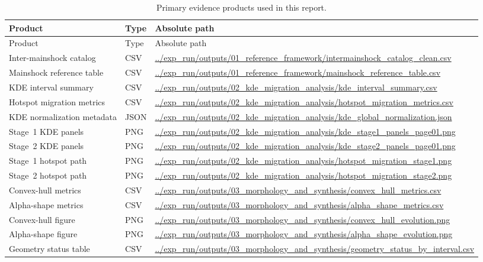 \documentclass[11pt]{article}
\begin{document}
\begin{longtable}{>{\raggedright\arraybackslash}p{3.3cm} >{\raggedright\arraybackslash}p{2.5cm} >{\raggedright\arraybackslash}p{8.2cm}}
\caption{Primary evidence products used in this report.}\label{tab:evidence}\\
\toprule
Product & Type & Absolute path \\
\midrule
\endfirsthead
\toprule
Product & Type & Absolute path \\
\midrule
\endhead
Inter-mainshock catalog & CSV & \url{../exp_run/outputs/01_reference_framework/intermainshock_catalog_clean.csv} \\
Mainshock reference table & CSV & \url{../exp_run/outputs/01_reference_framework/mainshock_reference_table.csv} \\
KDE interval summary & CSV & \url{../exp_run/outputs/02_kde_migration_analysis/kde_interval_summary.csv} \\
Hotspot migration metrics & CSV & \url{../exp_run/outputs/02_kde_migration_analysis/hotspot_migration_metrics.csv} \\
KDE normalization metadata & JSON & \url{../exp_run/outputs/02_kde_migration_analysis/kde_global_normalization.json} \\
Stage~1 KDE panels & PNG & \url{../exp_run/outputs/02_kde_migration_analysis/kde_stage1_panels_page01.png} \\
Stage~2 KDE panels & PNG & \url{../exp_run/outputs/02_kde_migration_analysis/kde_stage2_panels_page01.png} \\
Stage~1 hotspot path & PNG & \url{../exp_run/outputs/02_kde_migration_analysis/hotspot_migration_stage1.png} \\
Stage~2 hotspot path & PNG & \url{../exp_run/outputs/02_kde_migration_analysis/hotspot_migration_stage2.png} \\
Convex-hull metrics & CSV & \url{../exp_run/outputs/03_morphology_and_synthesis/convex_hull_metrics.csv} \\
Alpha-shape metrics & CSV & \url{../exp_run/outputs/03_morphology_and_synthesis/alpha_shape_metrics.csv} \\
Convex-hull figure & PNG & \url{../exp_run/outputs/03_morphology_and_synthesis/convex_hull_evolution.png} \\
Alpha-shape figure & PNG & \url{../exp_run/outputs/03_morphology_and_synthesis/alpha_shape_evolution.png} \\
Geometry status table & CSV & \url{../exp_run/outputs/03_morphology_and_synthesis/geometry_status_by_interval.csv} \\
\bottomrule
\end{longtable}
\end{document}
